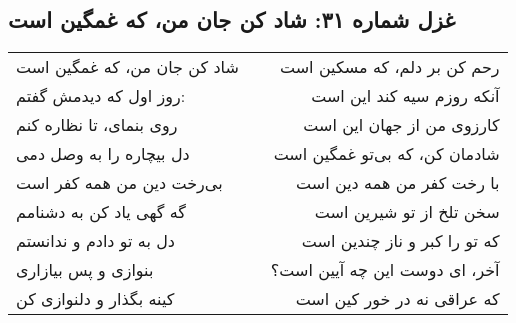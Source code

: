 \begin{center}
\section*{غزل شماره ۳۱: شاد کن جان من، که غمگین است}
\label{sec:031}
\begin{longtable}{l p{0.5cm} r}
شاد کن جان من، که غمگین است
&&
رحم کن بر دلم، که مسکین است
\\
روز اول که دیدمش گفتم:
&&
آنکه روزم سیه کند این است
\\
روی بنمای، تا نظاره کنم
&&
کارزوی من از جهان این است
\\
دل بیچاره را به وصل دمی
&&
شادمان کن، که بی‌تو غمگین است
\\
بی‌رخت دین من همه کفر است
&&
با رخت کفر من همه دین است
\\
گه گهی یاد کن به دشنامم
&&
سخن تلخ از تو شیرین است
\\
دل به تو دادم و ندانستم
&&
که تو را کبر و ناز چندین است
\\
بنوازی و پس بیازاری
&&
آخر، ای دوست این چه آیین است؟
\\
کینه بگذار و دلنوازی کن
&&
که عراقی نه در خور کین است
\\
\end{longtable}
\end{center}
